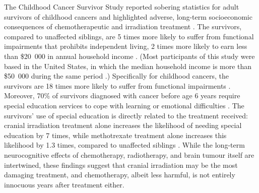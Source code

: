 The Childhood Cancer Survivor Study reported sobering statistics for adult survivors of childhood cancers and highlighted adverse, long-term socioeconomic consequences of chemotherapeutic and irradiation treatment . The survivors, compared to unaffected siblings, are 5 times more likely to suffer from functional impairments that prohibits independent living, 2 times more likely to earn less than \$20~000 in annual household income . (Most participants of this study were based in the United States, in which the median household income is more than \$50~000 during the same period .) Specifically for childhood  cancers, the survivors are 18 times more likely to suffer from functional impairments . Moreover, 70\% of survivors diagnosed with  cancer before age 6 years require special education services to cope with learning or emotional difficulties . The survivors' use of special education is directly related to the treatment received: cranial irradiation treatment alone increases the likelihood of needing special education by 7 times, while methotrexate treatment alone increases this likelihood by 1.3 times, compared to unaffected siblings . While the long-term neurocognitive effects of chemotherapy, radiotherapy, and brain tumour itself are intertwined, these findings suggest that cranial irradiation may be the most damaging treatment, and chemotherapy, albeit less harmful, is not entirely innocuous years after treatment either.

